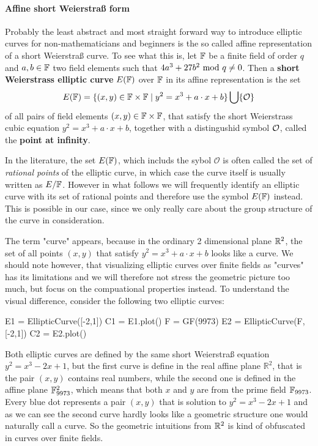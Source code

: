 \paragraph{Affine short Weierstraß form} Probably the least abstract and most straight forward way to introduce elliptic curves for non-mathematicians and beginners is the so called affine representation of a short Weierstraß curve. To see what this is, let $\mathbb{F}$ be a finite field of order $q$ and $a,b\in \mathbb{F}$ two field elements such that $4a^3+ 27b^2 \text{ mod } q\neq 0$. Then a \textbf{short Weierstrass elliptic curve} $E(\mathbb{F})$ over $\mathbb{F}$ in its affine representation is the set
\begin{equation}
\label{def_short_weierstrass_curve}
E(\mathbb{F}) = \{(x,y)\in \mathbb{F}\times \mathbb{F}\;|\; y^2=x^3+a\cdot x+b \} \bigcup \{\mathcal{O}\}
\end{equation}
of all pairs of field elements $(x,y)\in \mathbb{F}\times \mathbb{F}$, that satisfy the short Weierstrass cubic equation $y^2=x^3+a\cdot x+b$, together with a distingushid symbol $\mathcal{O}$, called the \textbf{point at infinity}.
\begin{notation}
In the literature, the set $E(\mathbb{F})$, which includs the sybol $\mathcal{O}$ is often called the set of \textit{rational points} of the elliptic curve, in which case the curve itself is usually written as $E/\mathbb{F}$. However in what follows we will frequently identify an elliptic curve with its set of rational points and therefore use the symbol $E(\mathbb{F})$ instead. This is possible in our case, since we only really care about the group structure of the curve in consideration.
\end{notation}
The term "curve" appears, because in the ordinary 2 dimensional plane $\mathbb{R}^2$,
the set of all points $(x,y)$ that satisfy $y^2 = x^3 +a\cdot x +b$ looks like a curve. We should note however, that visualizing elliptic curves over finite fields as "curves" has its limitations and we will therefore not stress the geometric picture too much, but focus on the compuational properties instead. To understand the visual difference, consider the following two elliptic curves: 
\begin{sagesilent}
E1 = EllipticCurve([-2,1])
C1 = E1.plot()
F = GF(9973)
E2 = EllipticCurve(F, [-2,1])
C2 = E2.plot()
\end{sagesilent}
\begin{center} 
\end{center}
Both elliptic curves are defined by the same short Weierstraß equation $y^2 = x^3-2x+1$, but the first curve is define in the real affine plane $\mathbb{R}^2$, that is the pair $(x,y)$ contains real numbers, while the second one is defined in the affine plane $\mathbb{F}_{9973}^2$, which means that both $x$ and $y$ are from the prime field $\mathbb{F}_{9973}$. Every blue dot represents a pair $(x,y)$ that is solution to $y^2 = x^3-2x+1$ and as we can see the second curve hardly looks like a geometric structure one would naturally call a curve. So the geometric intuitions from $\mathbb{R}^2$ is kind of obfuscated in curves over finite fields.

